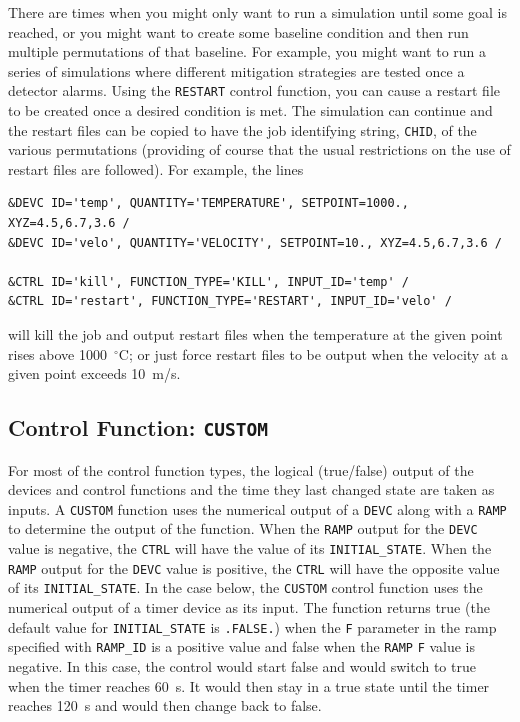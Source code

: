 \documentclass[11pt]{book}
\newcommand{\ct}{\tt\small}
\begin{document}
There are times when you might only want to run a simulation until some
goal is reached, or you might want to create some
baseline condition and then run multiple permutations of that baseline.
For example, you might want to run a series of simulations where
different mitigation strategies are tested once a detector alarms.
Using the {\ct RESTART}
control function, you can cause a restart file
to be created once a desired condition is met.  The simulation can
continue and the restart files can be copied to have the job identifying string, {\ct CHID}, of
the various permutations (providing of course that the usual
restrictions on the use of restart files are followed).
For example, the lines

\footnotesize
\begin{verbatim}
&DEVC ID='temp', QUANTITY='TEMPERATURE', SETPOINT=1000., XYZ=4.5,6.7,3.6 /
&DEVC ID='velo', QUANTITY='VELOCITY', SETPOINT=10., XYZ=4.5,6.7,3.6 /

&CTRL ID='kill', FUNCTION_TYPE='KILL', INPUT_ID='temp' /
&CTRL ID='restart', FUNCTION_TYPE='RESTART', INPUT_ID='velo' /
\end{verbatim} \normalsize

\noindent
will kill the job and output restart files when the temperature at the given point rises above
1000~$^\circ$C; or just force restart files to be output when the velocity at a given point exceeds 10~m/s.



\subsection{Control Function: \texorpdfstring{{\tt CUSTOM}}{CUSTOM} }
\label{info:CUSTOM}

For most of the control function types, the logical (true/false) output of
the devices and control functions and the time they last changed
state are taken as inputs.  A {\ct CUSTOM} function uses the numerical output of a {\ct DEVC} along with
a {\ct RAMP} to determine the output of the function.  When the {\ct RAMP} output for the {\ct DEVC} value is negative, the
{\ct CTRL} will have the value of its {\ct INITIAL\_STATE}.  When the {\ct RAMP} output for the {\ct DEVC} value is positive, the
{\ct CTRL} will have the opposite value of its {\ct INITIAL\_STATE}. In the case below, the {\ct CUSTOM}
control function uses the numerical output of a timer device as its input.  The function returns true (the default value for
{\ct INITIAL\_STATE} is {\ct .FALSE.}) when the {\ct F} parameter
in the ramp specified with {\ct RAMP\_ID} is a positive value and
false when the {\ct RAMP} {\ct F} value is negative.
In this case, the control would start false and would switch to
true when the timer reaches 60~s.  It would then stay in a true
state until the timer reaches 120~s and would then change back to false.
\end{document}
